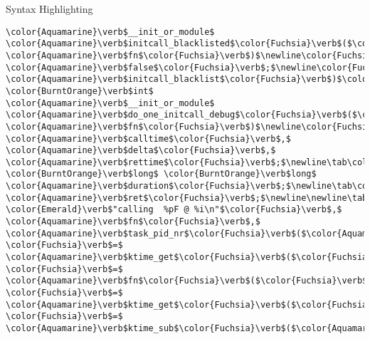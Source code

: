 \begin{frame}{Syntax Highlighting}
\begin{verbatim}
\color{Aquamarine}\verb$__init_or_module$ \color{Aquamarine}\verb$initcall_blacklisted$\color{Fuchsia}\verb$($\color{Aquamarine}\verb$initcall_t$ \color{Aquamarine}\verb$fn$\color{Fuchsia}\verb$)$\newline\color{Fuchsia}\verb${$\newline\tab\color{BurntOrange}\verb$return$ \color{Aquamarine}\verb$false$\color{Fuchsia}\verb$;$\newline\color{Fuchsia}\verb$}$\newline\color{Gray}\verb$#endif$\newline\color{Aquamarine}\verb$__setup$\color{Fuchsia}\verb$($\color{Emerald}\verb$"initcall_blacklist="$\color{Fuchsia}\verb$,$ \color{Aquamarine}\verb$initcall_blacklist$\color{Fuchsia}\verb$)$\color{Fuchsia}\verb$;$\newline\newline\color{BurntOrange}\verb$static$ \color{BurntOrange}\verb$int$ \color{Aquamarine}\verb$__init_or_module$ \color{Aquamarine}\verb$do_one_initcall_debug$\color{Fuchsia}\verb$($\color{Aquamarine}\verb$initcall_t$ \color{Aquamarine}\verb$fn$\color{Fuchsia}\verb$)$\newline\color{Fuchsia}\verb${$\newline\tab\color{Aquamarine}\verb$ktime_t$ \color{Aquamarine}\verb$calltime$\color{Fuchsia}\verb$,$ \color{Aquamarine}\verb$delta$\color{Fuchsia}\verb$,$ \color{Aquamarine}\verb$rettime$\color{Fuchsia}\verb$;$\newline\tab\color{BurntOrange}\verb$unsigned$ \color{BurntOrange}\verb$long$ \color{BurntOrange}\verb$long$ \color{Aquamarine}\verb$duration$\color{Fuchsia}\verb$;$\newline\tab\color{BurntOrange}\verb$int$ \color{Aquamarine}\verb$ret$\color{Fuchsia}\verb$;$\newline\newline\tab\color{Aquamarine}\verb$printk$\color{Fuchsia}\verb$($\color{Aquamarine}\verb$KERN_DEBUG$ \color{Emerald}\verb$"calling  %pF @ %i\n"$\color{Fuchsia}\verb$,$ \color{Aquamarine}\verb$fn$\color{Fuchsia}\verb$,$ \color{Aquamarine}\verb$task_pid_nr$\color{Fuchsia}\verb$($\color{Aquamarine}\verb$current$\color{Fuchsia}\verb$)$\color{Fuchsia}\verb$)$\color{Fuchsia}\verb$;$\newline\tab\color{Aquamarine}\verb$calltime$ \color{Fuchsia}\verb$=$ \color{Aquamarine}\verb$ktime_get$\color{Fuchsia}\verb$($\color{Fuchsia}\verb$)$\color{Fuchsia}\verb$;$\newline\tab\color{Aquamarine}\verb$ret$ \color{Fuchsia}\verb$=$ \color{Aquamarine}\verb$fn$\color{Fuchsia}\verb$($\color{Fuchsia}\verb$)$\color{Fuchsia}\verb$;$\newline\tab\color{Aquamarine}\verb$rettime$ \color{Fuchsia}\verb$=$ \color{Aquamarine}\verb$ktime_get$\color{Fuchsia}\verb$($\color{Fuchsia}\verb$)$\color{Fuchsia}\verb$;$\newline\tab\color{Aquamarine}\verb$delta$ \color{Fuchsia}\verb$=$ \color{Aquamarine}\verb$ktime_sub$\color{Fuchsia}\verb$($\color{Aquamarine}\verb$rettime$\color{Fuchsia}\verb$,$ 
\end{verbatim}
\end{frame}

